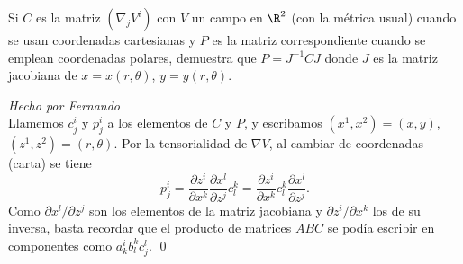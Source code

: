 \begin{problem}[7]Si $C$ es la matriz $(\nabla_j V^i)$ con $V$ un campo en $\R^2$ (con
	la métrica usual) cuando se usan coordenadas cartesianas y $P$ es
	la matriz correspondiente cuando se emplean coordenadas polares,
	demuestra que $P=J^{-1}CJ$ donde $J$ es la matriz jacobiana de $x=x(r,\theta)$,  $y=y(r,\theta)$.
	
	\solution\textit{Hecho por Fernando}\\ Llamemos $c_j^i$ y $p^i_j$ a los elementos de $C$ y $P$, y escribamos $(x^1,x^2)=(x,y)$, $(z^1,z^2)=(r,\theta)$. Por la tensorialidad de $\nabla V$, al cambiar de coordenadas (carta) se tiene 
	\[
	p^i_j
	=
	\frac{\partial z^i}{\partial x^k}
	\frac{\partial x^l}{\partial z^j}
	c_l^k
	=
	\frac{\partial z^i}{\partial x^k}
	c_l^k
	\frac{\partial x^l}{\partial z^j}.
	\]
	Como ${\partial x^l}/{\partial z^j}$ son los elementos de la matriz jacobiana y ${\partial z^i}/{\partial x^k}$ los de su inversa, basta recordar que el producto de matrices $ABC$ se podía escribir en componentes como $a^i_kb^k_lc^l_j$. \qed
	
	
\end{problem}
